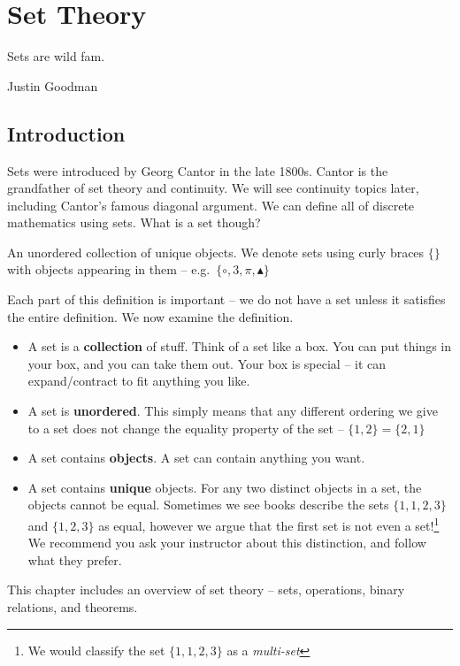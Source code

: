 \documentclass[main.tex]{subfiles}
\begin{document}
\chapter{Set Theory}

\epigraph{Sets are wild fam.}{Justin Goodman}

\minitoc

\section{Introduction}

Sets were introduced by Georg Cantor in the late 1800s. Cantor is the grandfather of set theory and continuity. We will see continuity topics later, including Cantor's famous diagonal argument. We can define all of discrete mathematics using sets. What is a set though?

\begin{defn}
	An unordered collection of unique objects. We denote sets using curly braces \(\{\}\) with objects appearing in them -- e.g.\ \(\{\circ, 3, \pi, \blacktriangle\}\)
\end{defn}

Each part of this definition is important -- we do not have a set unless it satisfies the entire definition. We now examine the definition.

\begin{itemize}
	\item A set is a \textbf{collection} of stuff. Think of a set like a box. You can put things in your box, and you can take them out. Your box is special -- it can expand/contract to fit anything you like.
	\item A set is \textbf{unordered}. This simply means that any different ordering we give to a set does not change the equality property of the set -- \(\{1,2\} = \{2,1\}\)
	\item A set contains \textbf{objects}. A set can contain anything you want.
	\item A set contains \textbf{unique} objects. For any two distinct objects in a set, the objects cannot be equal. Sometimes we see books describe the sets \(\{1,1,2,3\}\) and \(\{1,2,3\}\) as equal, however we argue that the first set is not even a set!\footnote{We would classify the set \(\{1,1,2,3\}\) as a \textit{multi-set}} We recommend you ask your instructor about this distinction, and follow what they prefer.
\end{itemize}

This chapter includes an overview of set theory -- sets, operations, binary relations, and theorems.
\end{document}
